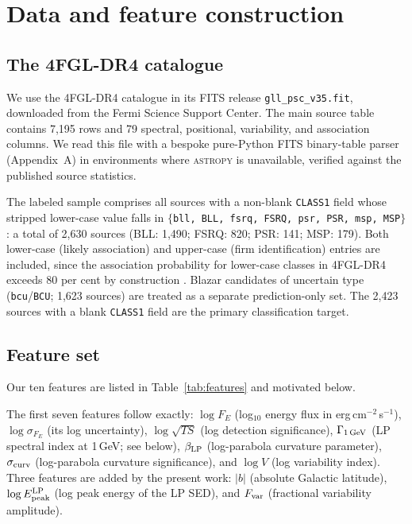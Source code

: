 \documentclass[fleqn,12pt]{article}
\newcommand{\fgl}{4FGL-DR4}
\newcommand{\sigs}{\sigma_{\rm curv}}
\newcommand{\GamLP}{\Gamma_{\rm 1\,GeV}}
\newcommand{\betaLP}{\beta_{\rm LP}}
\newcommand{\Epeak}{E^{\rm LP}_{\rm peak}}
\newcommand{\logV}{\log V}
\newcommand{\GALL}{|b|}
\newcommand{\Fvar}{F_{\rm var}}
\begin{document}
\section{Data and feature construction}
\label{sec:data}

\subsection{The 4FGL-DR4 catalogue}
\label{ssec:4fgl}

We use the \fgl{} catalogue \citep{Ballet2023} in its FITS release
\texttt{gll\_psc\_v35.fit}, downloaded from the Fermi Science Support
Center. The main source table contains 7,195 rows and 79 spectral,
positional, variability, and association columns. We read this file
with a bespoke pure-Python FITS binary-table parser (Appendix~A) in
environments where \textsc{astropy} is unavailable, verified against
the published source statistics.

The labeled sample comprises all sources with a non-blank
\texttt{CLASS1} field whose stripped lower-case value falls in
$\{$\texttt{bll, BLL, fsrq, FSRQ, psr, PSR, msp, MSP}$\}$: a total
of 2,630 sources (BLL: 1,490; FSRQ: 820; PSR: 141; MSP: 179). Both
lower-case (likely association) and upper-case (firm identification)
entries are included, since the association probability for
lower-case classes in \fgl{} exceeds 80 per cent by construction
\citep{Ballet2023}. Blazar candidates of uncertain type
(\texttt{bcu}/\texttt{BCU}; 1,623 sources) are treated as a
separate prediction-only set. The 2,423 sources with a blank
\texttt{CLASS1} field are the primary classification target.

\subsection{Feature set}
\label{ssec:features}

Our ten features are listed in Table~\ref{tab:features} and motivated
below.

The first seven features follow \citet{Malyshev2023} exactly:
$\log F_E$ (log$_{10}$ energy flux in erg\,cm$^{-2}$\,s$^{-1}$),
$\log\sigma_{F_E}$ (its log uncertainty),
$\log\sqrt{TS}$ (log detection significance),
$\GamLP$ (LP spectral index at 1\,GeV; see below),
$\betaLP$ (log-parabola curvature parameter),
$\sigs$ (log-parabola curvature significance),
and $\logV$ (log variability index).
Three features are added by the present work:
$\GALL$ (absolute Galactic latitude),
$\log\Epeak$ (log peak energy of the LP SED),
and $\Fvar$ (fractional variability amplitude).
\end{document}
